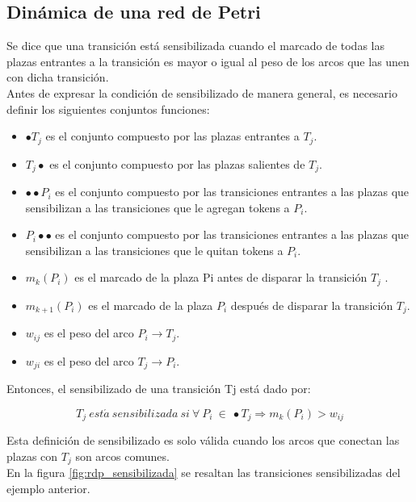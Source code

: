 \subsection{Dinámica de una red de Petri}
Se dice que una transición está sensibilizada cuando el marcado de todas las plazas entrantes a la transición es mayor o igual al peso de los arcos que las unen con dicha transición. \cite{papermico}\\

Antes de expresar la condición de sensibilizado de manera general, es necesario definir los siguientes conjuntos funciones:

\begin{itemize}
    \item $\bullet T_j$ es el conjunto compuesto por las plazas entrantes a $T_j$.
    \item $T_j \bullet$  es el conjunto compuesto por las plazas salientes de $T_j$.
    \item $\bullet \bullet P_i$ es el conjunto compuesto por las transiciones entrantes a las plazas que sensibilizan a las transiciones que le agregan tokens a $P_i$.
    \item $P_i \bullet \bullet$  es el conjunto compuesto por las transiciones entrantes a las plazas que sensibilizan a las transiciones que le quitan tokens a $P_i$.
    \item $m_k(P_i)$ es el marcado de la plaza Pi antes de disparar la transición $T_j$ .
    \item $m_{k+1}(P_i)$ es el marcado de la plaza $P_i$ después de disparar la transición $T_j$.
    \item $w_{ij}$ es el peso del arco $P_i \rightarrow T_j$.
    \item $w_{ji}$ es el peso del arco $T_j \rightarrow P_i$.
\end{itemize}

Entonces, el sensibilizado de una transición Tj está dado por:

\begin{equation}
    T_j \ est\acute{a} \ sensibilizada \ si \ \forall \ P_i \ \in \ \bullet T_j \Rightarrow m_k (P_i) > w_{ij}
\end{equation}

Esta definición de sensibilizado es solo válida cuando los arcos que conectan las plazas con $T_j$ son arcos comunes. \\
En la figura \ref{fig:rdp_sensibilizada} se resaltan las transiciones sensibilizadas del ejemplo anterior.

